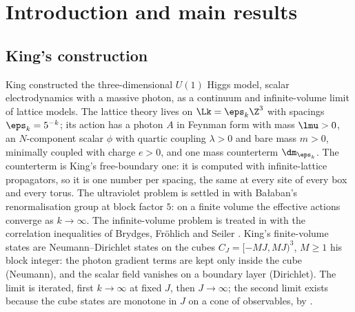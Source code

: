 \section{Introduction and main results}

\subsection{King's construction}

King \cite{K1,K2} constructed the three-dimensional $U(1)$ Higgs model, scalar electrodynamics with a
massive photon, as a continuum and infinite-volume limit of lattice models. The lattice theory lives on
$\Lk=\eps_k\Z^3$ with spacings $\eps_k=5^{-k}$; its action has a photon $A$ in Feynman form with mass
$\lmu>0$, an $N$-component scalar $\phi$ with quartic coupling $\lambda>0$ and bare mass $m>0$, minimally
coupled with charge $e>0$, and one mass counterterm $\dm_{\eps_k}$. The counterterm is King's free-boundary
one: it is computed with infinite-lattice propagators, so it is one number per spacing, the same at every
site of every box and every torus. The ultraviolet problem is settled in \cite{K1} with Ba{\l}aban's
renormalisation group \cite{Ba1,Ba2,Ba3,Ba4} at block factor $5$: on a finite volume the effective
actions converge as $k\to\infty$. The infinite-volume problem is treated in \cite{K2} with the correlation
inequalities of Brydges, Fr\"ohlich and Seiler \cite{BFS1}. King's finite-volume states are
Neumann--Dirichlet states on the cubes $C_J=[-MJ,MJ)^3$, $M\ge1$ his block integer: the photon gradient
terms are kept only inside the cube (Neumann), and the scalar field vanishes on a boundary layer
(Dirichlet). The limit is iterated, first $k\to\infty$ at fixed $J$, then $J\to\infty$; the second limit
exists because the cube states are monotone in $J$ on a cone of observables, by \cite{BFS1}.


